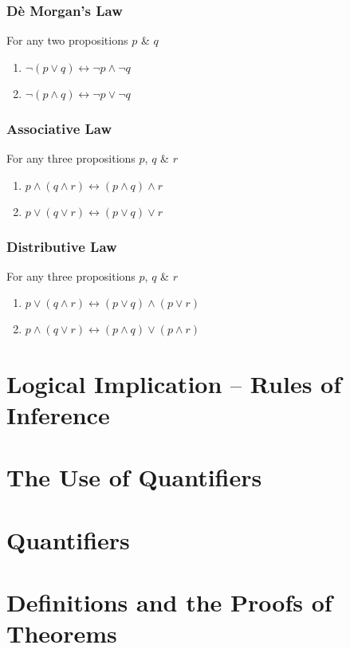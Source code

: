 \documentclass{article}
\begin{document}
	\subsubsection{D\`{e} Morgan's Law}
	For any two propositions $p$ \& $q$
	\begin{enumerate}[label=\roman*) ]
		\item $\neg(p\lor q)\leftrightarrow\neg p\land\neg q$
		\item $\neg(p\land q)\leftrightarrow\neg p\lor\neg q$
	\end{enumerate}

	\subsubsection{Associative Law}
	For any three propositions $p$, $q$ \& $r$
	\begin{enumerate}[label=\roman*) ]
		\item $p\land(q\land r)\leftrightarrow (p\land q)\land r$
		\item $p\lor(q\lor r)\leftrightarrow (p\lor q)\lor r$
	\end{enumerate}

	\subsubsection{Distributive Law}
	For any three propositions $p$, $q$ \& $r$
	\begin{enumerate}[label=\roman*) ]
		\item $p\lor(q\land r)\leftrightarrow (p\lor q)\land(p\lor r)$
		\item $p\land(q\lor r)\leftrightarrow (p\land q)\lor(p\land r)$
	\end{enumerate}

	\section{Logical Implication $–$ Rules of Inference}

	\section{The Use of Quantifiers}
	\section{Quantifiers}
	\section{Definitions and the Proofs of Theorems}
\end{document}
